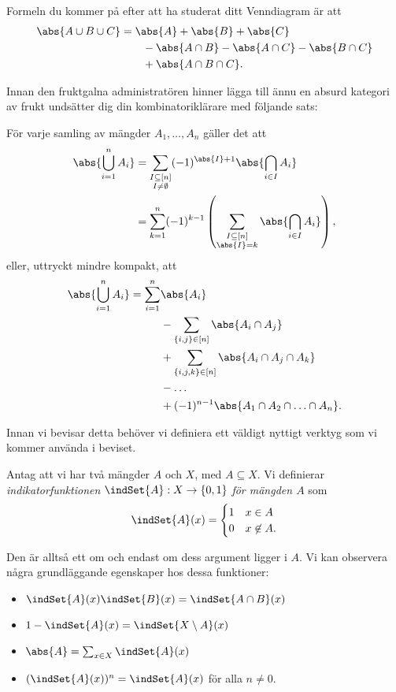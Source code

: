 \documentclass[nobib]{tufte-handout}
\begin{document}
Formeln du kommer på efter att ha studerat ditt Venndiagram är att
\begin{align*}
  \abs{A \cup B \cup C} &= \abs{A} + \abs{B} + \abs{C}\\
  &\qquad - \abs{A \cap B} - \abs{A \cap C} - \abs{B \cap C}\\
  &\qquad + \abs{A \cap B \cap C}.
\end{align*}

Innan den fruktgalna administratören hinner lägga till ännu en absurd kategori av frukt undsätter dig din kombinatoriklärare med följande sats:
\begin{theorem}\label{theorem_inclusion_exclusion}
  För varje samling av mängder $A_1, \ldots, A_n$ gäller det att
  \begin{align*}
    \abs{\bigcup_{i=1}^n A_i} &= \sum_{\substack{I \subseteq [n]\\I\neq\emptyset}} (-1)^{\abs{I}+1}\abs{\bigcap_{i \in I} A_i}\\
    &=\sum_{k=1}^{n} (-1)^{k-1}\left(\sum_{\substack{I \subseteq [n]\\\abs{I} = k}} \abs{\bigcap_{i \in I} A_i}\right),
  \end{align*}
  eller, uttryckt mindre kompakt, att
  \begin{align*}
    \abs{\bigcup_{i=1}^n A_i} = \sum_{i=1}^n &\abs{A_i}\\
    & - \sum_{\{i,j\} \in [n]} \abs{A_i \cap A_j}\\
    & + \sum_{ \{i, j, k\} \in [n] } \abs{A_i \cap A_j \cap A_k}\\
    & - \ldots\\
    & + (-1)^{n-1}\abs{A_1\cap A_2\cap\ldots\cap A_n}.
  \end{align*}
\end{theorem}

Innan vi bevisar detta behöver vi definiera ett väldigt nyttigt verktyg som vi kommer använda i beviset.

\begin{definition}
  Antag att vi har två mängder $A$ och $X$, med $A \subseteq X$. Vi definierar \emph{indikatorfunktionen} $\indSet{A}: X \to \{0,1\}$ \emph{för mängden $A$} som
  $$\indSet{A}(x) = \begin{cases}
    1  & x \in A \\
    0 & x \not\in A.
  \end{cases}$$

  Den är alltså ett om och endast om dess argument ligger i $A$. Vi kan observera några grundläggande egenskaper hos dessa funktioner:
  \begin{itemize}
    \item $\indSet{A}(x)\indSet{B}(x) = \indSet{A\cap B}(x)$
    \item $1 - \indSet{A}(x) = \indSet{X \setminus A}(x)$
    \item $\abs{A} = \sum_{x \in X} \indSet{A}(x)$
    \item $(\indSet{A}(x))^n = \indSet{A}(x)$ för alla $n \neq 0$.
  \end{itemize}
\end{definition}
\end{document}
